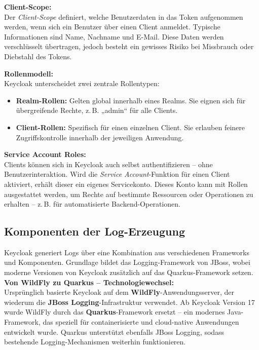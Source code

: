 \documentclass[a4paper,12pt]{article}
\let\footnote=\endnote
\begin{document}
	\vspace{0.5em}
	\textbf{Client-Scope:}\\
	Der \textit{Client-Scope} definiert, welche Benutzerdaten in das Token aufgenommen werden, wenn sich ein Benutzer über einen Client anmeldet. Typische Informationen sind Name, Nachname und E-Mail. Diese Daten werden verschlüsselt übertragen, jedoch besteht ein gewisses Risiko bei Missbrauch oder Diebstahl des Tokens.
	
	\vspace{0.5em}
	\textbf{Rollenmodell:}\\
	Keycloak unterscheidet zwei zentrale Rollentypen:
	
	\begin{itemize}
		\item \textbf{Realm-Rollen:} Gelten global innerhalb eines Realms. Sie eignen sich für übergreifende Rechte, z.\,B. „admin“ für alle Clients.
		\item \textbf{Client-Rollen:} Spezifisch für einen einzelnen Client. Sie erlauben feinere Zugriffskontrolle innerhalb der jeweiligen Anwendung.
	\end{itemize}
	
	\vspace{0.5em}
	\textbf{Service Account Roles:}\\
	Clients können sich in Keycloak auch selbst authentifizieren – ohne Benutzerinteraktion. Wird die \textit{Service Account}-Funktion für einen Client aktiviert, erhält dieser ein eigenes Servicekonto. Dieses Konto kann mit Rollen ausgestattet werden, um Rechte auf bestimmte Ressourcen oder Operationen zu erhalten – z.\,B. für automatisierte Backend-Operationen.
	
	\subsection{Komponenten der Log-Erzeugung}
	Keycloak generiert Logs über eine Kombination aus verschiedenen Frameworks und Komponenten. Grundlage bildet das Logging-Framework von JBoss, wobei moderne Versionen von Keycloak zusätzlich auf das Quarkus-Framework setzen.
	\vspace{0.5em}
	\textbf{Von WildFly zu Quarkus – Technologiewechsel:}\\
	Ursprünglich basierte Keycloak auf dem \textbf{WildFly}-Anwendungsserver\footnote{\url{https://www.wildfly.org/}}, der wiederum die \textbf{JBoss Logging}-Infrastruktur verwendet. Ab Keycloak Version 17 wurde WildFly durch das \textbf{Quarkus}-Framework ersetzt – ein modernes Java-Framework, das speziell für containerisierte und cloud-native Anwendungen entwickelt wurde. Quarkus unterstützt ebenfalls JBoss Logging, sodass bestehende Logging-Mechanismen weiterhin funktionieren.
	
\end{document}
